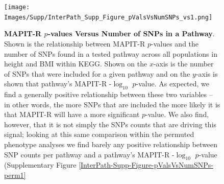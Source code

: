 \documentclass[12pt, a4paper]{article}
\begin{document}
\begin{figure}[htbp]
\centering
\texttt{[image: Images/Supp/InterPath\_Supp\_Figure\_pValsVsNumSNPs\_vs1.png]}
\caption[TBD]{\textbf{MAPIT-R $p$-values Versus Number of SNPs in a Pathway}. \\ Shown is the relationship between MAPIT-R $p$-values and the number of SNPs found in a tested pathway across all populations in height and BMI within KEGG. Shown on the $x$-axis is the number of SNPs that were included for a given pathway and on the $y$-axis is shown that pathway's MAPIT-R -$\log_{10}$ $p$-value. As expected, we find a generally positive relationship between these two variables -- in other words, the more SNPs that are included the more likely it is that MAPIT-R will have a more significant $p$-value. We also find, however, that it is not simply the SNPs counts that are driving this signal; looking at this same comparison within the permuted phenotype analyses we find barely any positive relationship between SNP counts per pathway and a pathway's MAPIT-R -$\log_{10}$ $p$-value (Supplementary Figure \ref{InterPath-Supp-Figure-pValsVsNumSNPs-perm1}}
\label{InterPath-Supp-Figure-pValsVsNumSNPs}
\end{figure}
\clearpage


\end{document}

